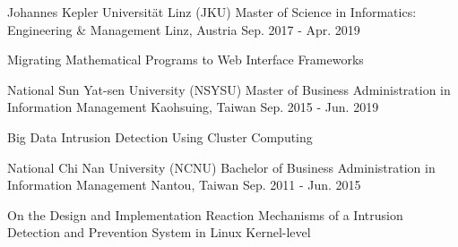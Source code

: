 


\begin{cventries}


\cventry
{Johannes Kepler Universität Linz (JKU)} %
{Master of Science in Informatics: Engineering \& Management} %
{Linz, Austria} %
{Sep. 2017 - Apr. 2019} %
{ %
\begin{cvitems}
\item {Migrating Mathematical Programs to Web Interface Frameworks}
\end{cvitems}
}



\cventry
{National Sun Yat-sen University (NSYSU)} %
{Master of Business Administration in Information Management} %
{Kaohsuing, Taiwan} %
{Sep. 2015 - Jun. 2019} %
{ %
\begin{cvitems}
\item {Big Data Intrusion Detection Using Cluster Computing}
\end{cvitems}
}



\cventry
{National Chi Nan University (NCNU)} %
{Bachelor of Business Administration in Information Management} %
{Nantou, Taiwan} %
{Sep. 2011 - Jun. 2015} %
{ %
\begin{cvitems}
\item {On the Design and Implementation Reaction Mechanisms of a Intrusion Detection and Prevention System in Linux Kernel-level}
\end{cvitems}
}


\end{cventries}